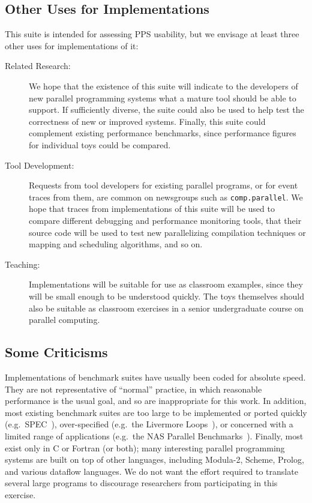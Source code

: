\subsection{Other Uses for Implementations\label{s:method-uses}}

This suite is intended for assessing PPS usability,
but we envisage at least three other uses for implementations of it:
\begin{description}
\item[Related Research:]
	We hope that the existence of this suite will indicate
	to the developers of new parallel programming systems
	what a mature tool should be able to support.
	If sufficiently diverse,
	the suite could also be used to help test the correctness of new or improved systems.
	Finally,
	this suite could complement existing performance benchmarks,
	since performance figures for individual toys could be compared.
\item[Tool Development:]
	Requests from tool developers for existing parallel programs,
	or for event traces from them,
	are common on newsgroups such as {\tt{comp.parallel}}.
	We hope that traces from implementations of this suite
	will be used to compare different debugging and performance monitoring tools,
	that their source code will be used to test
	new parallelizing compilation techniques or mapping and scheduling algorithms,
	and so on.
\item[Teaching:]
	Implementations will be suitable for use as classroom examples,
	since they will be small enough to be understood quickly.
	The toys themselves should also be suitable as classroom exercises
	in a senior undergraduate course on parallel computing.
\end{description}

\subsection{Some Criticisms\label{s:method-criticism}}


Implementations of benchmark suites have usually been coded for absolute speed.
They are not representative of ``normal'' practice,
in which reasonable performance is the usual goal,
and so are inappropriate for this work.
In addition,
most existing benchmark suites are too large to be implemented or ported quickly
(e.g.\ SPEC~\cite{b:bench-over}),
over-specified (e.g.\ the Livermore Loops~\cite{b:livermore-loops}),
or concerned with a limited range of applications
(e.g.\ the NAS Parallel Benchmarks~\cite{b:nas-results}).
Finally,
most exist only in C or Fortran (or both);
many interesting parallel programming systems are built on top of other languages,
including Modula-2, Scheme, Prolog, and various dataflow languages.
We do not want the effort required to translate several large programs
to discourage researchers from participating in this exercise.

